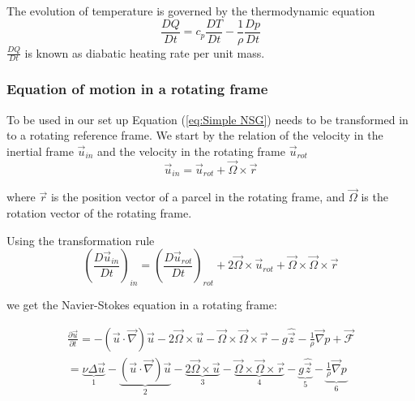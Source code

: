 \documentclass[12pt, a4paper, twoside]{article}
\begin{document}
		The evolution of temperature is governed by the thermodynamic equation
		\begin{equation}
			\frac{DQ}{Dt} = c_p \frac{DT}{Dt} - \frac{1}{\rho} \frac{Dp}{Dt}
			\label{eq:Thermodyn}
		\end{equation}
		$\frac{DQ}{Dt}$ is known as diabatic heating rate per unit mass. %
		
		
		\subsubsection{Equation of motion in a rotating frame}		%
			To be used in our set up Equation (\ref{eq:Simple NSG}) needs to be transformed in to a rotating reference frame. We start by the relation of the velocity in the inertial frame $\vec{u}_{in}$ and the velocity in the rotating frame $\vec{u}_{rot}$
			\begin{equation}
				\vec{u}_{in} = \vec{u}_{rot} + \vec{\Omega}\times\vec{r}
				\label{eq:Velocity Frames}
			\end{equation}
			
			where $\vec{r}$ is the position vector of a parcel in the rotating frame, and $\vec{\Omega}$ is the rotation vector of the rotating frame.
			
			Using the transformation rule %
			\begin{equation}
				\left(\frac{D\vec{u}_{in}}{Dt}\right)_{in} = \left(\frac{D\vec{u}_{rot}}{Dt}\right)_{rot} + 2\vec{\Omega}\times\vec{u}_{rot} + \vec{\Omega}\times\vec{\Omega}\times\vec{r}
				\label{eq: Lag Dev Rot}
			\end{equation}
			
			we get the Navier-Stokes equation in a rotating frame:
			
			\begin{eqnarray}
				\frac{\partial\vec{u}}{\partial t}
				= - \left(\vec{u}\cdot\vec{\nabla}\right)\vec{u} - 2\vec{\Omega}\times\vec{u} - \vec{\Omega}\times\vec{\Omega}\times\vec{r} - g\hat{\vec{z}} - \frac{1}{\rho}\vec{\nabla}p + \vec{\mathcal{F}}
				\nonumber \\
				= \underbrace{\nu\Delta\vec{u}}_{1} - \underbrace{\left(\vec{u}\cdot\vec{\nabla}\right)\vec{u}}_{2} - \underbrace{2\vec{\Omega}\times\vec{u}}_{3}- \underbrace{\vec{\Omega}\times\vec{\Omega}\times\vec{r}}_{4} - \underbrace{g\hat{\vec{z}}}_{5} - \underbrace{\frac{1}{\rho}\vec{\nabla}p}_{6}
				\label{eq: NSG}
			\end{eqnarray}
			
\end{document}
